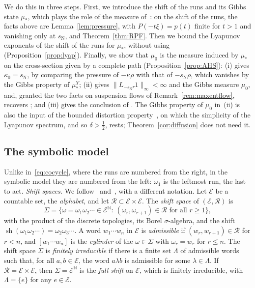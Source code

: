 \documentclass[11pt]{amsart}
\theoremstyle{definition}
\theoremstyle{remark}
\newcommand{\N}{\mathbb N}
\newcommand{\sN}{s_{\mathrm N}}
\newcommand{\norm}[1]{\lVert #1\rVert}
\begin{document}
We do this in three steps. First, we introduce the shift of the runs and its Gibbs state $\mu_*$, which plays the role of the measure of~\cite{GMR19}: on the shift of the runs, the facts above are Lemma~\ref{lem:pressure}, with $P(-t\xi)=p(t)$ finite for $t>1$ and vanishing only at $\sN$, and Theorem~\ref{thm:RPF}. Then we bound the Lyapunov exponents of the shift of the runs for $\mu_*$, without using~\cite{AHSinv} (Proposition~\ref{prop:lyap}). Finally, we show that $\mu_0$ is the measure induced by $\mu_*$ on the cross-section given by a complete path (Proposition~\ref{prop:AHS}): (i) gives $\kappa_0=\sN$, by comparing the pressure of $-\kappa\rho$ with that of $-\sN\rho$, which vanishes by the Gibbs property of $\mu_*^Y$; (ii) gives $\norm{L_{-\sN r}1}_\infty<\infty$ and the Gibbs measure $\mu_0$, and, granted the two facts on suspension flows of Remark~\ref{rem:maxentflow}, recovers \cite[Thm.~25]{AHSinv}; and (iii) gives the conclusion of \cite[Lemma~26]{AHSinv}.
The Gibbs property of $\mu_0$ in~(ii) is also the input of the bounded distortion property~\cite[Lemma~36]{AHSinv}, on which the simplicity of the Lyapunov spectrum, and so $\delta>\frac12$, rests; Theorem~\ref{cor:diffusion} does not need it.

\subsection*{The symbolic model}
Unlike in~\eqref{eq:cocycle}, where the runs are numbered from the right, in the symbolic model they are numbered from the left: $\omega_1$ is the leftmost run, the last to act.
\emph{Shift spaces.}
We follow~\cite[\S2.1]{MU03} and~\cite[\S2.1]{KK16}, with a different notation. Let $\mathcal E$ be a countable set, the \emph{alphabet}, and let $\mathcal R\subset\mathcal E\times\mathcal E$. The \emph{shift space} of $(\mathcal E,\mathcal R)$ is
\[
  \Sigma=\bigl\{\omega=\omega_1\omega_2\cdots\in\mathcal E^{\N}:\ (\omega_r,\omega_{r+1})\in\mathcal R\text{ for all }r\ge1\bigr\},
\]
with the product of the discrete topologies, its Borel $\sigma$-algebra, and the shift $\operatorname{sh}(\omega_1\omega_2\cdots)=\omega_2\omega_3\cdots$. A word $w_1\cdots w_n$ in $\mathcal E$ is \emph{admissible} if $(w_r,w_{r+1})\in\mathcal R$ for $r<n$, and $[w_1\cdots w_n]$ is the \emph{cylinder} of the $\omega\in\Sigma$ with $\omega_r=w_r$ for $r\le n$. The shift space $\Sigma$ is \emph{finitely irreducible} if there is a finite set $\Lambda$ of admissible words such that, for all $a,b\in\mathcal E$, the word $a\lambda b$ is admissible for some $\lambda\in\Lambda$. If $\mathcal R=\mathcal E\times\mathcal E$, then $\Sigma=\mathcal E^{\N}$ is the \emph{full shift} on $\mathcal E$, which is finitely irreducible, with $\Lambda=\{e\}$ for any $e\in\mathcal E$.
\end{document}
